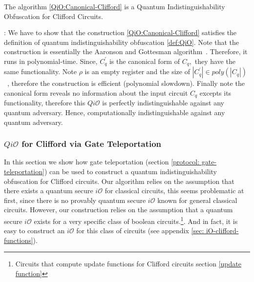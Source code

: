  \begin{lemma}
The algorithm \ref{QiO:Canonical-Clifford} is a Quantum Indistinguishability Obfuscation for Clifford Circuits.
\end{lemma}

: We have to show that the construction \ref{QiO:Canonical-Clifford} satisfies the definition of quantum indistinguishability obfuscation \ref{def:QiO}. Note that the construction is essentially the Aaronson and Gottesman  algorithm~\cite{AG04}. Therefore, it runs in polynomial-time. 
Since,  $C_q^\prime$ is the canonical form of $C_q,$ they have the same functionality. Note $\rho$ is an empty register and the size of $|C_q^\prime| \in poly(|C_q|)$ ~\cite{AG04}, therefore the construction is efficient (polynomial slowdown). Finally note the canonical form reveals no information about the input circuit $C_q$ excepts its functionality, therefore this $Qi\mathcal{O}$ is perfectly indistinguishable against any quantum adversary. Hence, computationally indistinguishable against any quantum adversary.



\subsubsection{$Qi\mathcal{O}$ for Clifford via Gate Teleportation}
\label{sec:Clifford-iO-teleportaion}
In this section we  show how gate teleportation (section \ref{protocol: gate-teleportation}) can be used to construct a quantum indistinguishability obfuscation for Clifford circuits. Our algorithm relies on the assumption that there exists a quantum secure $i\mathcal{O}$ for classical circuits, this seems problematic at first, since there is no provably quantum secure $i\mathcal{O}$ known for general classical circuits.
However,  our construction relies on the assumption that a quantum secure $i\mathcal{O}$ exists for a very specific class of boolean circuits.\footnote{Circuits that compute update functions for Clifford circuits section \ref{update function}}.  And in fact, it is easy to construct an $i\mathcal{O}$ for this class of circuits (see appendix \ref{sec: iO-clifford-functions}). %



